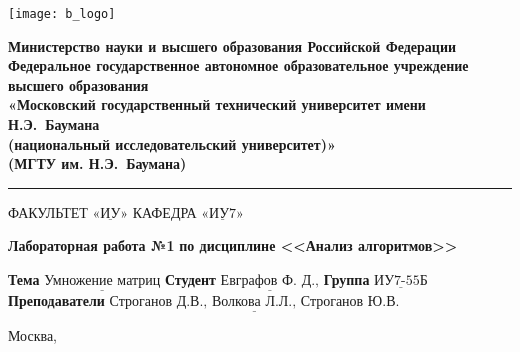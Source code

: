 \thispagestyle{empty}

\noindent \begin{minipage}{0.15\textwidth}
	\texttt{[image: b\_logo]}
\end{minipage}
\noindent\begin{minipage}{0.85\textwidth}\centering
	\textbf{Министерство науки и высшего образования Российской Федерации}\\
	\textbf{Федеральное государственное автономное образовательное учреждение высшего образования}\\
	\textbf{«Московский государственный технический университет имени Н.Э.~Баумана}\\
	\textbf{(национальный исследовательский университет)»}\\
	\textbf{(МГТУ им. Н.Э.~Баумана)}
\end{minipage}

\noindent\rule{\linewidth}{3pt}
\newline\newline
\noindent ФАКУЛЬТЕТ $\underline{\text{«ИУ»}}$ \newline\newline
\noindent КАФЕДРА $\underline{\text{«ИУ7»}}$

\vspace{1cm}

\begin{center}
	\noindent\begin{minipage}{1.3\textwidth}\centering
		\Large\textbf{  Лабораторная работа №1}\newline
		\textbf{по дисциплине <<Анализ алгоритмов>>}\newline\newline
	\end{minipage}
\end{center}

\noindent\textbf{Тема} $\underline{\text{Умножение матриц}}$\newline\newline
\noindent\textbf{Студент} $\underline{\text{Евграфов Ф. Д.,}}$\newline\newline
\noindent\textbf{Группа} $\underline{\text{ИУ7-55Б}}$\newline\newline
\noindent\textbf{Преподаватели} $\underline{\text{Строганов Д.В., Волкова Л.Л., Строганов Ю.В.}}$\newline

\begin{center}
	\vfill
	Москва,~\the\year
\end{center}


\clearpage
